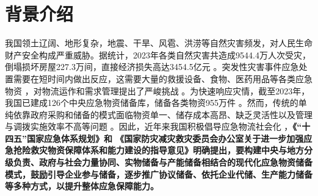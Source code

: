 \documentclass[a4paper,8pt,twocolumn]{article} %
\begin{document}



\section{背景介绍}

我国领土辽阔、地形复杂，地震、干旱、风雹、洪涝等自然灾害频发，对人民生命财产安全构成严重威胁。据统计，2023年各类自然灾害共造成9544.4万人次受灾，倒塌损坏房屋227.3万间，直接经济损失高达3454.5亿元 \cite{MEM2024disaster}。突发性灾害事件应急处置需要在短时间内做出反应，这需要大量的救援设备、食物、医药用品等各类应急物资 \cite{chen2009modern}，对物流运作和需求管理提出了严峻挑战 \cite{sheu2010dynamic, chang2007scenario}。为快速响应灾情，截至2023年，我国已建成126个中央应急物资储备库，储备各类物资955万件 \cite{MEM2023floodconference}。然而，传统的单纯依靠政府采购和储备的模式面临物资单一、储存成本高昂、缺乏灵活性以及管理与调拨实施效率不高等问题 \cite{chen2014突发事件灾前应急物资政企联合储备模式, wang2023防汛物资}。因此，近年来我国积极倡导应急物流社会化 \cite{lu2009应急物资储备的社会化研究}，\textbf{《“十四五”国家应急体系规划》\cite{ndrc2022}和 《国家防灾减灾救灾委员会办公室关于进一步加强应急抢险救灾物资保障体系和能力建设的指导意见》\cite{sfdrrmc2024}明确提出，要构建中央与地方分级负责、政府与社会力量协同、实物储备与产能储备相结合的现代化应急物资储备模式，鼓励引导企业参与储备，逐步推广协议储备、依托企业代储、生产能力储备等多种方式，以提升整体应急保障能力。}
\end{document}
